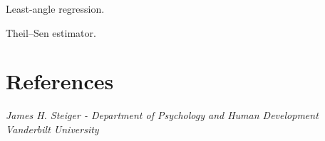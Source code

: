 \documentclass{article}
\begin{document}
    Least-angle regression.
    
    Theil–Sen estimator.
    
    \vspace{\baselineskip}
    
\section {References}
    \textit{James H. Steiger - Department of Psychology and Human Development Vanderbilt University}
%   
%    
%    
\end{document}
